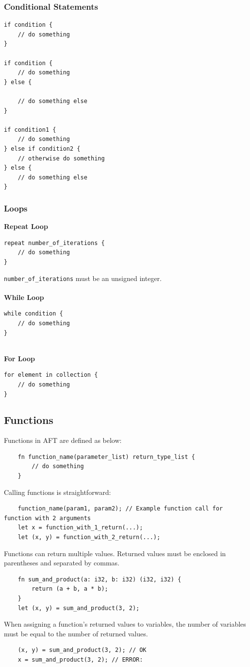 \subsubsection{Conditional Statements}
\begin{verbatim}
if condition {
    // do something
}

if condition {
    // do something
} else {

    // do something else
}

if condition1 {
    // do something
} else if condition2 {
    // otherwise do something
} else {
    // do something else
}
\end{verbatim}

\subsubsection{Loops}
\textbf{Repeat Loop}
\begin{verbatim}
repeat number_of_iterations {
    // do something
}
\end{verbatim}
\texttt{number_of_iterations} must be an unsigned integer. \\
\phantom{.} \\
\textbf{While Loop}
\begin{verbatim}
while condition {
    // do something
}
\end{verbatim}
\phantom{.} \\
\textbf{For Loop}
\begin{verbatim}
for element in collection {
    // do something
}
\end{verbatim}

\subsection{Functions}
Functions in AFT are defined as below:
\begin{verbatim}
    fn function_name(parameter_list) return_type_list {
        // do something
    }
\end{verbatim}
Calling functions is straightforward:
\begin{verbatim}
    function_name(param1, param2); // Example function call for function with 2 arguments
    let x = function_with_1_return(...);
    let (x, y) = function_with_2_return(...);
\end{verbatim}
Functions can return multiple values. Returned values must be enclosed in parentheses and separated by commas.
\begin{verbatim}
    fn sum_and_product(a: i32, b: i32) (i32, i32) {
        return (a + b, a * b);
    }
    let (x, y) = sum_and_product(3, 2);
\end{verbatim}
When assigning a function's returned values to variables, the number of variables must be equal to the number of returned values.
\begin{verbatim}
    (x, y) = sum_and_product(3, 2); // OK
    x = sum_and_product(3, 2); // ERROR: 
\end{verbatim}

